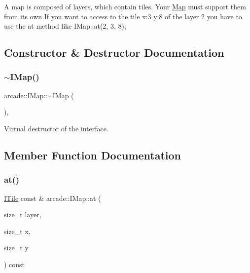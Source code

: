 A map is composed of layers, which contain tiles. Your \hyperlink{classarcade_1_1_map}{Map} must support them from its own If you want to access to the tile x\+:3 y\+:8 of the layer 2 you have to use the at method like I\+Map\+::at(2, 3, 8); 

\subsection{Constructor \& Destructor Documentation}
\mbox{\label{classarcade_1_1_i_map_aaa3aa1b624552b9ab830067ab42f78dd}} 
\subsubsection{\texorpdfstring{$\sim$\+I\+Map()}{~IMap()}}
{\footnotesize\ttfamily arcade\+::\+I\+Map\+::$\sim$\+I\+Map (\begin{DoxyParamCaption}{ }\end{DoxyParamCaption})\hspace{0.3cm}{\ttfamily [inline]}, {\ttfamily [virtual]}}



Virtual destructor of the interface. 



\subsection{Member Function Documentation}
\mbox{\label{classarcade_1_1_i_map_a8206c36a51d8394145fd3b7b29e42f8d}} 
\subsubsection{\texorpdfstring{at()}{at()}}
{\footnotesize\ttfamily \hyperlink{classarcade_1_1_i_tile}{I\+Tile} const  \& arcade\+::\+I\+Map\+::at (\begin{DoxyParamCaption}\item[{size\+\_\+t}]{layer,  }\item[{size\+\_\+t}]{x,  }\item[{size\+\_\+t}]{y }\end{DoxyParamCaption}) const\hspace{0.3cm}{\ttfamily [pure virtual]}}



